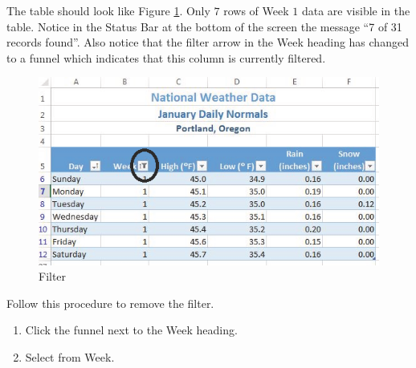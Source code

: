 The table should look like Figure \ref{05:fig16}. Only $ 7 $ rows of Week $ 1 $ data are visible in the table. Notice in the Status Bar at the bottom of the screen the message ``7 of 31 records found''. Also notice that the filter arrow in the Week heading has changed to a funnel which indicates that this column is currently filtered.

\begin{figure}[H]
	\centering
	\includegraphics[width=\maxwidth{.95\linewidth}]{gfx/ch05_fig16}
	\caption{Filter}
	\label{05:fig16}
\end{figure}

Follow this procedure to remove the filter.

\begin{enumerate}
	\item Click the funnel next to the Week heading.
	\item Select  from Week.
\end{enumerate}

